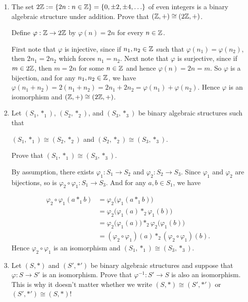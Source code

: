 \documentclass[11pt,fleqn,dvipsnames,usenames]{article}
\begin{document}
\begin{enumerate}[1.]
\item The set $2\mathbb{Z} := \left\{2n:n\in\mathbb{Z}\right\} = \left\{0, \pm 2, \pm 4,\ldots\right\}$ of even integers is a binary algebraic structure under addition.  Prove that $(\mathbb{Z},+)\cong (2\mathbb{Z},+)$.
\vsmsp

\solution Define $\varphi:\mathbb{Z}\to 2\mathbb{Z}$ by $\varphi(n) = 2n$ for every $n\in \mathbb{Z}$.
\vsmsp

First note that $\varphi$ is injective, since if $n_{1},n_{2}\in\mathbb{Z}$ such that $\varphi(n_{1}) = \varphi(n_{2})$, then $2n_{1} = 2n_{2}$ which forces $n_{1} = n_{2}$.  Next note that $\varphi$ is surjective, since if $m\in 2\mathbb{Z}$, then $m = 2n$ for some $n\in \mathbb{Z}$ and hence $\varphi(n) = 2n = m$.  So $\varphi$ is a bijection, and for any $n_{1},n_{2}\in \mathbb{Z}$, we have $\varphi(n_{1} + n_{2}) = 2(n_{1} + n_{2}) = 2n_{1} + 2n_{2} = \varphi(n_{1}) + \varphi(n_{2})$.  Hence $\varphi$ is an isomorphism and $(\mathbb{Z},+)\cong (2\mathbb{Z},+)$.
%
\item Let $(S_{1},*_{1})$, $(S_{2}, *_{2})$, and $(S_{3}, *_{3})$ be binary algebraic structures such that
\begin{center}
$(S_{1},*_{1})\cong(S_{2},*_{2})$ and $(S_{2},*_{2})\cong(S_{3},*_{3})$.
\end{center}
Prove that $(S_{1},*_{1})\cong(S_{3},*_{3})$.
\vsmsp

\solution By assumption, there exists $\varphi_{1}:S_{1}\to S_{2}$ and $\varphi_{2}:S_{2}\to S_{3}$.  Since $\varphi_{1}$ and $\varphi_{2}$ are bijections, so is $\varphi_{2}\circ \varphi_{1}:S_{1}\to S_{3}$.  And for any $a,b\in S_{1}$, we have

\begin{align*}
\varphi_{2}\circ \varphi_{1}(a *_{1} b) &= \varphi_{2}\big(\varphi_{1}(a*_{1}b)\big)\\
&= \varphi_{2}\big(\varphi_{1}(a)*_{2}\varphi_{1}(b)\big)\\
&= \varphi_{2}\big(\varphi_{1}(a)\big)*_{2} \varphi_{2}\big(\varphi_{1}(b)\big)\\
&= (\varphi_{2}\circ\varphi_{1})(a)*_{2}(\varphi_{2}\circ \varphi_{1})(b).
\end{align*}
Hence $\varphi_{2}\circ \varphi_{1}$ is an isomorphism and $(S_{1},*_{1})\cong(S_{3},*_{3})$.
%

\item Let $(S,*)$ and $(S',*')$ be binary algebraic structures and suppose that $\varphi:S\to S'$ is an isomorphism.  Prove that $\varphi^{-1}:S'\to S$ is also an isomorphism.
\note This is why it doesn't matter whether we write $(S,*)\cong (S',*')$ or $(S',*')\cong (S,*)$!
%
\vsmsp


\end{enumerate}
\end{document}
